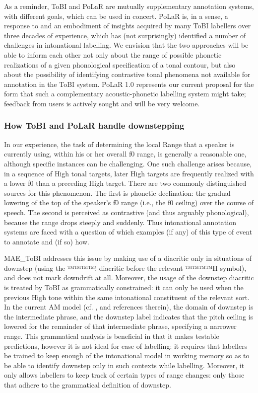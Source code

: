 \documentclass[11pt, twoside]{memoir}
\begin{document}
As a reminder, ToBI and PoLaR are mutually supplementary annotation systems, with different goals, which can be used in concert.  PoLaR is, in a sense, a response to and an embodiment of insights acquired by many ToBI labellers over three decades of experience, which has (not surprisingly) identified a number of challenges in intonational labelling. We envision that the two approaches will be able to inform each other not only about the range of possible phonetic realizations of a given phonological specification of a tonal contour, but also about the possibility of identifying contrastive tonal phenomena not available for annotation in the ToBI system. PoLaR 1.0 represents our current proposal for the form that such a complementary acoustic-phonetic labelling system might take; feedback from users is actively sought and will be very welcome.

\subsubsection{How ToBI and PoLaR handle downstepping}\label{sec:downstepping-am-models-and-tobi-annotation}
In our experience, the task of determining the local Range that a speaker is currently using, within his or her overall f0 range, is generally a reasonable one, although specific instances can be challenging. One such challenge arises because, in a sequence of High tonal targets, later High targets are frequently realized with a lower f0 than a preceding High target. There are two commonly distinguished sources for this phenomenon. The first is phonetic declination: the gradual lowering of the top of the speaker’s f0 range (i.e., the f0 ceiling) over the course of speech. The second is perceived as contrastive (and thus arguably phonological), because the range drops steeply and suddenly. Thus intonational annotation systems are faced with a question of which examples (if any) of this type of event to annotate and (if so) how.

MAE\_ToBI addresses this issue by making use of a diacritic only in situations of downstep (using the ™™™™{!} diacritic before the relevant ™™™™{H} symbol), and does not mark downdrift at all. Moreover, the usage of the downstep diacritic is treated by ToBI as grammatically constrained: it can only be used when the previous High tone within the same intonational constituent of the relevant sort. In the current AM model (cf. \citealt[17–18]{beckman-05}, and references therein), the domain of downstep is the intermediate phrase, and the downstep label indicates that the pitch ceiling is lowered for the remainder of that intermediate phrase, specifying a narrower range. This grammatical analysis is beneficial in that it makes testable predictions, however it is not ideal for ease of labelling: it requires that labellers be trained to keep enough of the intonational model in working memory so as to be able to identify downstep only in such contexts while labelling. Moreover, it only allows labellers to keep track of certain types of range changes: only those that adhere to the grammatical definition of downstep.
\end{document}
